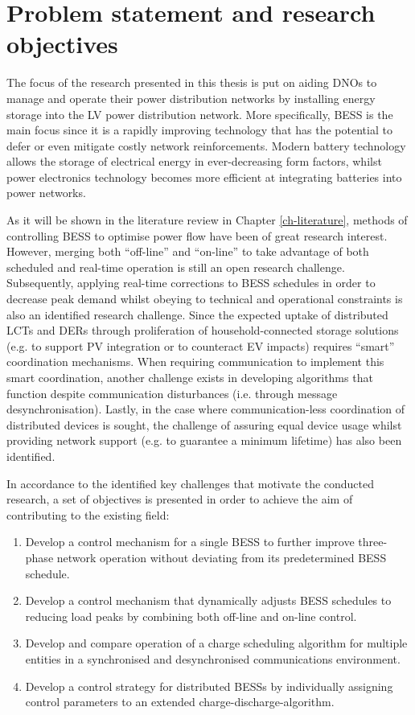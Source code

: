 \section{Problem statement and research objectives}
\label{ch-introduction:sec:problem-statement}

The focus of the research presented in this thesis is put on aiding DNOs to manage and operate their power distribution networks by installing energy storage into the LV power distribution network.
More specifically, BESS is the main focus since it is a rapidly improving technology that has the potential to defer or even mitigate costly network reinforcements.
Modern battery technology allows the storage of electrical energy in ever-decreasing form factors, whilst power electronics technology becomes more efficient at integrating batteries into power networks.

As it will be shown in the literature review in Chapter \ref{ch-literature}, methods of controlling BESS to optimise power flow have been of great research interest.
However, merging both ``off-line'' and ``on-line'' to take advantage of both scheduled and real-time operation is still an open research challenge.
Subsequently, applying real-time corrections to BESS schedules in order to decrease peak demand whilst obeying to technical and operational constraints is also an identified research challenge.
Since the expected uptake of distributed LCTs and DERs through proliferation of household-connected storage solutions (e.g. to support PV integration or to counteract EV impacts) requires ``smart'' coordination mechanisms.
When requiring communication to implement this smart coordination, another challenge exists in developing algorithms that function despite communication disturbances (i.e. through message desynchronisation).
Lastly, in the case where communication-less coordination of distributed devices is sought, the challenge of assuring equal device usage whilst providing network support (e.g. to guarantee a minimum lifetime) has also been identified.

In accordance to the identified key challenges that motivate the conducted research, a set of objectives is presented in order to achieve the aim of contributing to the existing field:

\begin{enumerate}[
labelindent=*,
style=multiline,
leftmargin=*,
label=\textbf{Objective \arabic*}
]
	\item Develop a control mechanism for a single BESS to further improve three-phase network operation without deviating from its predetermined BESS schedule.
	\item Develop a control mechanism that dynamically adjusts BESS schedules to reducing load peaks by combining both off-line and on-line control.
	\item Develop and compare operation of a charge scheduling algorithm for multiple entities in a synchronised and desynchronised communications environment.
	\item Develop a control strategy for distributed BESSs by individually assigning control parameters to an extended charge-discharge-algorithm.
\end{enumerate}

